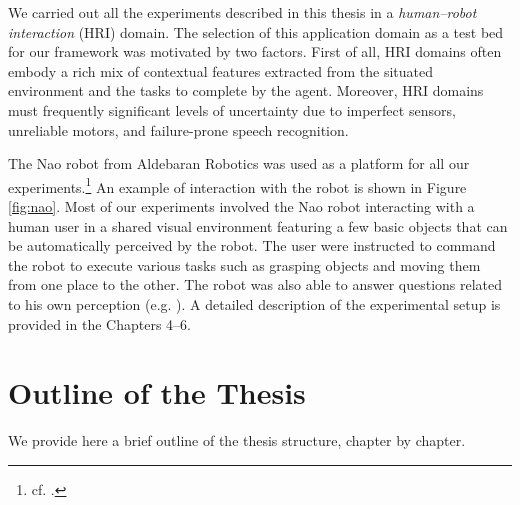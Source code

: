 We carried out all the experiments described in this thesis in a \textit{human--robot interaction}  (HRI) domain.  The selection of this application domain as a test bed for our framework was motivated by two factors.  First of all, HRI domains often embody a rich mix of contextual features extracted from the situated environment and the tasks to complete by the agent. Moreover, HRI domains must frequently significant levels of uncertainty due to imperfect sensors, unreliable motors, and failure-prone speech recognition. 

The Nao robot from Aldebaran Robotics was used as a platform for all our experiments.\footnote{cf.  .}  An example of interaction with the robot is shown in Figure \ref{fig:nao}.  Most of our experiments involved the Nao robot interacting with a human user in a shared visual environment featuring a few basic objects that can be automatically perceived by the robot.  The user were instructed to command the robot to execute various tasks such as grasping objects and moving them from one place to the other.  The robot was also able to answer questions related to his own perception (e.g. ).  A detailed description of the experimental setup is provided in the Chapters 4--6. 

\section{Outline of the Thesis}

We provide here a brief outline of the thesis structure, chapter by chapter. 

